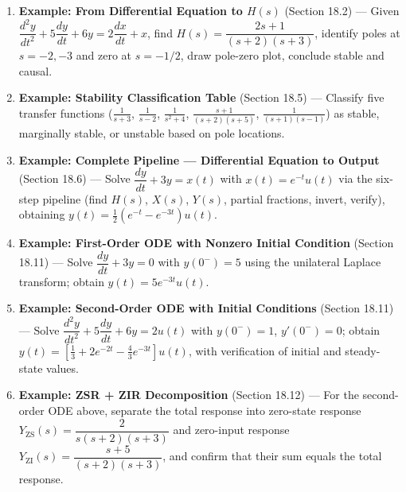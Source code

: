 \documentclass[11pt]{article}
\begin{document}
\begin{enumerate}
  \item \textbf{Example: From Differential Equation to $H(s)$} (Section 18.2) — Given $\dfrac{d^2y}{dt^2} + 5\dfrac{dy}{dt} + 6y = 2\dfrac{dx}{dt} + x$, find $H(s) = \dfrac{2s+1}{(s+2)(s+3)}$, identify poles at $s = -2, -3$ and zero at $s = -1/2$, draw pole-zero plot, conclude stable and causal.
  \item \textbf{Example: Stability Classification Table} (Section 18.5) — Classify five transfer functions ($\tfrac{1}{s+3}$, $\tfrac{1}{s-2}$, $\tfrac{1}{s^2+4}$, $\tfrac{s+1}{(s+2)(s+5)}$, $\tfrac{1}{(s+1)(s-1)}$) as stable, marginally stable, or unstable based on pole locations.
  \item \textbf{Example: Complete Pipeline — Differential Equation to Output} (Section 18.6) — Solve $\dfrac{dy}{dt} + 3y = x(t)$ with $x(t) = e^{-t}u(t)$ via the six-step pipeline (find $H(s)$, $X(s)$, $Y(s)$, partial fractions, invert, verify), obtaining $y(t) = \tfrac{1}{2}(e^{-t} - e^{-3t})u(t)$.
  \item \textbf{Example: First-Order ODE with Nonzero Initial Condition} (Section 18.11) — Solve $\dfrac{dy}{dt} + 3y = 0$ with $y(0^-) = 5$ using the unilateral Laplace transform; obtain $y(t) = 5e^{-3t}u(t)$.
  \item \textbf{Example: Second-Order ODE with Initial Conditions} (Section 18.11) — Solve $\dfrac{d^2y}{dt^2} + 5\dfrac{dy}{dt} + 6y = 2u(t)$ with $y(0^-) = 1$, $y'(0^-) = 0$; obtain $y(t) = \left[\tfrac{1}{3} + 2e^{-2t} - \tfrac{4}{3}e^{-3t}\right]u(t)$, with verification of initial and steady-state values.
  \item \textbf{Example: ZSR + ZIR Decomposition} (Section 18.12) — For the second-order ODE above, separate the total response into zero-state response $Y_{\text{ZS}}(s) = \dfrac{2}{s(s+2)(s+3)}$ and zero-input response $Y_{\text{ZI}}(s) = \dfrac{s+5}{(s+2)(s+3)}$, and confirm that their sum equals the total response.
\end{enumerate}
\end{document}
